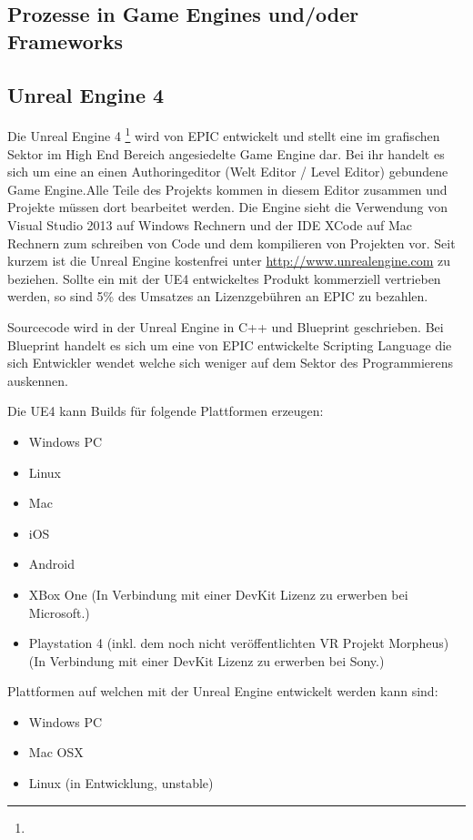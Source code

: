 \documentclass[pagesize, paper=a4, fontsize=12pt,titlepage=true, headings=small, headnosepline, abstractoff, liststotoc, nochapterprefix, plainheadsepline, twoside]{scrreprt}
\begin{document}
\subsection{Prozesse in Game Engines und/oder Frameworks}

\subsection{Unreal Engine 4}
Die Unreal Engine 4 \footnote{} wird von EPIC entwickelt und stellt eine im grafischen Sektor im High End Bereich angesiedelte Game Engine dar. Bei ihr handelt es sich um eine an einen Authoringeditor (Welt Editor / Level Editor) gebundene Game Engine.Alle Teile des Projekts kommen in diesem Editor zusammen und Projekte müssen dort bearbeitet werden. Die Engine sieht die Verwendung von Visual Studio 2013 auf Windows Rechnern und der IDE XCode auf Mac Rechnern zum schreiben von Code und dem kompilieren von Projekten vor. Seit kurzem ist die Unreal Engine kostenfrei unter \url{http://www.unrealengine.com} zu beziehen. Sollte ein mit der UE4 entwickeltes Produkt kommerziell vertrieben werden, so sind 5\% des Umsatzes an Lizenzgebühren an EPIC zu bezahlen.

Sourcecode wird in der Unreal Engine in C++ und Blueprint geschrieben. Bei Blueprint handelt es sich um eine von EPIC entwickelte Scripting Language die sich Entwickler wendet welche sich weniger auf dem Sektor des Programmierens auskennen.

Die UE4 kann Builds für folgende Plattformen erzeugen:
\begin{itemize}
\item Windows PC
\item Linux
\item Mac
\item iOS
\item Android
\item XBox One (In Verbindung mit einer DevKit Lizenz zu erwerben bei Microsoft.)
\item Playstation 4 (inkl. dem noch nicht veröffentlichten VR Projekt Morpheus) (In Verbindung mit einer DevKit Lizenz zu erwerben bei Sony.)
\end{itemize}

Plattformen auf welchen mit der Unreal Engine entwickelt werden kann sind:
\begin{itemize}
\item Windows PC
\item Mac OSX
\item Linux (in Entwicklung, unstable)
\end{itemize}
\end{document}
